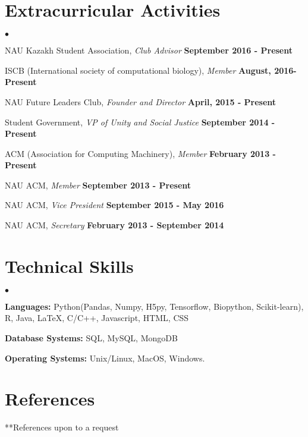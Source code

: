 \documentclass[margin,line]{res}
\newenvironment{list2}{
  \begin{list}{$\bullet$}{%
      \setlength{\itemsep}{0in}
      \setlength{\parsep}{0in} \setlength{\parskip}{0in}
      \setlength{\topsep}{0in} \setlength{\partopsep}{0in} 
      \setlength{\leftmargin}{0.2in}}}{\end{list}}
\begin{document}
\begin{resume}
\section{\sc Extracurricular Activities}
\begin{list2}
\item NAU Kazakh Student Association, {\em Club Advisor} \hfill {\bf September 2016 - Present} 
\item ISCB (International society of computational biology), {\em Member} \hfill {\bf August, 2016- Present}
\item NAU Future Leaders Club, {\em Founder and Director} \hfill {\bf April, 2015 - Present}
\item Student Government, {\em VP of Unity and Social Justice} \hfill  {\bf September 2014 - Present}
\item ACM (Association for Computing Machinery), {\em Member} \hfill  {\bf February 2013 - Present}
\item NAU ACM, {\em Member} \hfill {\bf September 2013 - Present}
\item NAU ACM, {\em Vice President} \hfill  {\bf September 2015 - May 2016}
\item NAU ACM, {\em Secretary} \hfill  {\bf February 2013 - September 2014}
\end{list2}

\section{\sc Technical Skills} 
\begin{list2}
\item {\bf Languages:}  Python(Pandas, Numpy, H5py, Tensorflow, Biopython, Scikit-learn), R, Java, \LaTeX, C/C++, Javascript, HTML, CSS
\item {\bf Database Systems:} SQL, MySQL, MongoDB
\item {\bf Operating Systems:}  Unix/Linux, MacOS, Windows.
\end{list2}

\section{\sc References} 
**References upon to a request



\end{resume}
\end{document}
